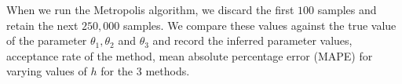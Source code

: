 \documentclass[graybox]{svmult}
\begin{document}
When we run the Metropolis algorithm, we discard the first $100$ samples and retain the next $250,000$ samples. We compare these values against the true value of the parameter $\theta_1, \theta_2$ and $\theta_3$ and record the inferred parameter values, acceptance rate of the method, mean absolute percentage error (MAPE) for varying values of $h$ for the 3 methods.
\vspace{-4mm}
\end{document}
